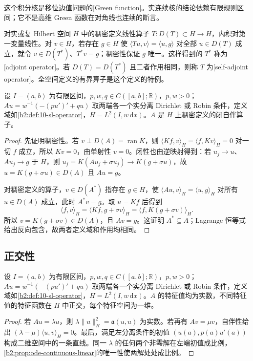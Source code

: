 这个积分核是移位边值问题的[Green function]。实连续核的结论依赖有限规则区间；它不是高维 Green 函数在对角线也连续的断言。

\ProseParagraphBreak

对实或复 Hilbert 空间 \(H\) 中的稠密定义线性算子 \(T:D(T)\subset H\to H\)，内积对第一变量线性。对 \(v\in H\)，若存在 \(g\in H\) 使 \(\langle Tu,v\rangle=\langle u,g\rangle\) 对全部 \(u\in D(T)\) 成立，就令 \(v\in D(T^*)\)、\(T^*v=g\)；稠密性保证 \(g\) 唯一。这样得到的 \(T^*\) 称为[adjoint operator]。若 \(D(T)=D(T^*)\) 且二者作用相同，则称 \(T\) 为[self-adjoint operator]。全空间定义的有界算子是这个定义的特例。

\begin{theorem}\label{b2:thm:10-self-adjoint}
设 \(I=(a,b)\) 为有限区间，\(p,w,q\in C([a,b];\mathbb R)\)，\(p,w>0\)；\(Au=w^{-1}(-(pu')'+qu)\) 取两端各一个实分离 Dirichlet 或 Robin 条件，定义域如\cref{b2:def:10-sl-operator}，\(H=L^2(I,w\,\mathrm dx)\)。\(A\) 是 \(H\) 上稠密定义的闭自伴算子。
\end{theorem}
\begin{proof}
先证明稠密性。若 \(v\perp D(A)=\operatorname{ran}K\)，则 \(\langle Kf,v\rangle_H=\langle f,Kv\rangle_H=0\) 对一切 \(f\) 成立，所以 \(Kv=0\)，由单射性 \(v=0\)。闭性也由逆映射得到：若 \(u_j\to u\)、\(Au_j\to g\) 于 \(H\)，则 \(u_j=K(Au_j+\sigma u_j)\to K(g+\sigma u)\)，故 \(u=K(g+\sigma u)\in D(A)\) 且 \(Au=g\)。

对稠密定义的算子，\(v\in D(A^*)\) 指存在 \(g\in H\)，使 \(\langle Au,v\rangle_H=\langle u,g\rangle_H\) 对所有 \(u\in D(A)\) 成立，此时 \(A^*v=g\)。取 \(u=Kf\) 后得到
\[
 \langle f,v\rangle_H
 =\langle Kf,g+\sigma v\rangle_H
 =\langle f,K(g+\sigma v)\rangle_H.
\]
所以 \(v=K(g+\sigma v)\in D(A)\)，且 \(Av=g\)。这证明 \(A^*\subseteq A\)；Lagrange 恒等式给出反向包含，故两者定义域和作用均相同。
\end{proof}

\subsection{正交性}
\label{b2:subsec:100203}

\begin{proposition}\label{b2:prop:10-real-orthogonal-simple}
设 \(I=(a,b)\) 为有限区间，\(p,w,q\in C([a,b];\mathbb R)\)，\(p,w>0\)；\(Au=w^{-1}(-(pu')'+qu)\) 取两端各一个实分离 Dirichlet 或 Robin 条件，定义域如\cref{b2:def:10-sl-operator}，\(H=L^2(I,w\,\mathrm dx)\)。\(A\) 的特征值均为实数，不同特征值的特征函数在 \(H\) 中正交，每个特征空间为一维。
\end{proposition}
\begin{proof}
若 \(Au=\lambda u\)，则 \(\lambda\|u\|_H^2=\mathfrak a(u,u)\) 为实数。若再有 \(Av=\mu v\)，自伴性给出 \((\lambda-\mu)\langle u,v\rangle_H=0\)。最后，满足左分离条件的初值 \((u(a),p(a)u'(a))\) 构成二维空间中的一条直线。同一 \(\lambda\) 的任何两个非零解在左端初值成比例，\cref{b2:prop:ode-continuous-linear}的唯一性使两解处处成比例。
\end{proof}

